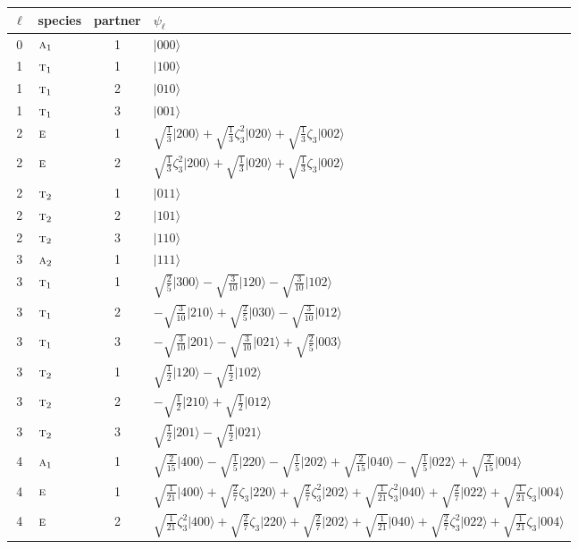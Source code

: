 \documentclass[11pt]{article}
\newcommand{\irr}[1]{\text{\normalfont\scshape #1}}
\newcommand{\rootunity}[1]{\zeta_{#1}}
\newcommand{\occ}[1]{\lvert #1\rangle}
\begin{document}
\begin{longtable}{c l c p{}}\hline $\ell$ & species & partner & $\psi_\ell$\\ \hline\endhead
0 & $\irr{a}_{1}$ & 1 & $\occ{000}$\\
\hline
1 & $\irr{t}_{1}$ & 1 & $\occ{100}$\\
1 & $\irr{t}_{1}$ & 2 & $\occ{010}$\\
1 & $\irr{t}_{1}$ & 3 & $\occ{001}$\\
\hline
2 & $\irr{e}$ & 1 & $\sqrt{\tfrac{1}{3}}\occ{200}+\sqrt{\tfrac{1}{3}}\rootunity{3}^{2}\occ{020}+\sqrt{\tfrac{1}{3}}\rootunity{3}\occ{002}$\\
2 & $\irr{e}$ & 2 & $\sqrt{\tfrac{1}{3}}\rootunity{3}^{2}\occ{200}+\sqrt{\tfrac{1}{3}}\occ{020}+\sqrt{\tfrac{1}{3}}\rootunity{3}\occ{002}$\\
2 & $\irr{t}_{2}$ & 1 & $\occ{011}$\\
2 & $\irr{t}_{2}$ & 2 & $\occ{101}$\\
2 & $\irr{t}_{2}$ & 3 & $\occ{110}$\\
\hline
3 & $\irr{a}_{2}$ & 1 & $\occ{111}$\\
3 & $\irr{t}_{1}$ & 1 & $\sqrt{\tfrac{2}{5}}\occ{300}-\sqrt{\tfrac{3}{10}}\occ{120}-\sqrt{\tfrac{3}{10}}\occ{102}$\\
3 & $\irr{t}_{1}$ & 2 & $-\sqrt{\tfrac{3}{10}}\occ{210}+\sqrt{\tfrac{2}{5}}\occ{030}-\sqrt{\tfrac{3}{10}}\occ{012}$\\
3 & $\irr{t}_{1}$ & 3 & $-\sqrt{\tfrac{3}{10}}\occ{201}-\sqrt{\tfrac{3}{10}}\occ{021}+\sqrt{\tfrac{2}{5}}\occ{003}$\\
3 & $\irr{t}_{2}$ & 1 & $\sqrt{\tfrac{1}{2}}\occ{120}-\sqrt{\tfrac{1}{2}}\occ{102}$\\
3 & $\irr{t}_{2}$ & 2 & $-\sqrt{\tfrac{1}{2}}\occ{210}+\sqrt{\tfrac{1}{2}}\occ{012}$\\
3 & $\irr{t}_{2}$ & 3 & $\sqrt{\tfrac{1}{2}}\occ{201}-\sqrt{\tfrac{1}{2}}\occ{021}$\\
\hline
4 & $\irr{a}_{1}$ & 1 & $\sqrt{\tfrac{2}{15}}\occ{400}-\sqrt{\tfrac{1}{5}}\occ{220}-\sqrt{\tfrac{1}{5}}\occ{202}+\sqrt{\tfrac{2}{15}}\occ{040}-\sqrt{\tfrac{1}{5}}\occ{022}+\sqrt{\tfrac{2}{15}}\occ{004}$\\
4 & $\irr{e}$ & 1 & $\sqrt{\tfrac{1}{21}}\occ{400}+\sqrt{\tfrac{2}{7}}\rootunity{3}\occ{220}+\sqrt{\tfrac{2}{7}}\rootunity{3}^{2}\occ{202}+\sqrt{\tfrac{1}{21}}\rootunity{3}^{2}\occ{040}+\sqrt{\tfrac{2}{7}}\occ{022}+\sqrt{\tfrac{1}{21}}\rootunity{3}\occ{004}$\\
4 & $\irr{e}$ & 2 & $\sqrt{\tfrac{1}{21}}\rootunity{3}^{2}\occ{400}+\sqrt{\tfrac{2}{7}}\rootunity{3}\occ{220}+\sqrt{\tfrac{2}{7}}\occ{202}+\sqrt{\tfrac{1}{21}}\occ{040}+\sqrt{\tfrac{2}{7}}\rootunity{3}^{2}\occ{022}+\sqrt{\tfrac{1}{21}}\rootunity{3}\occ{004}$\\

\end{longtable}
\end{document}
